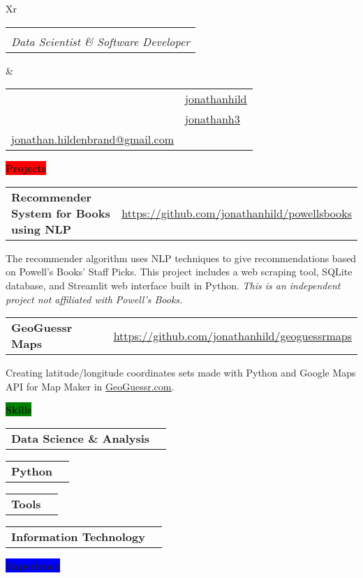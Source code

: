 \documentclass[letterpaper,12pt]{article}[leftmargin=*]
\makeatletter
\def\fullname{Jonathan Hildenbrand}
\def\subtitle{Data Scientist \& Software Developer}
\def\githubicon{\faGithub}
\def\githublink{https://github.com/jonathanhild}
\def\githubtext{jonathanhild}
\def\linkedinicon{\faLinkedin}
\def\linkedinlink{https://linkedin.com/in/jonathanh3}
\def\linkedintext{jonathanh3}
\def\phoneicon{\faPhone}
\def\phonetext{+1-971-409-0695}
\def\emailicon{\faEnvelope}
\def\emaillink{mailto:jonathan.hildenbrand+resume@gmail.com}
\def\emailtext{jonathan.hildenbrand@gmail.com}
\def\locationicon{\faMapMarker}
\def\locationtext{Portland, Oregon}
\def\targeticon{\faBinoculars}
\def\targettext{Local, Remote WFH \& Relocation}
\def\headertype{\doublecol} %
\def\entryspacing{-0pt}
\def\location{\hspace{3pt}\locationicon \hspace{5pt}{\color{links}\locationtext}}
\def\target{\targeticon\hspace{3pt}{\color{links}\targettext}}
\def\phone{\phoneicon\hspace{3pt}{\color{links}{\phonetext}}}
\def\linkedin{\linkedinicon\hspace{3pt}\href{\linkedinlink}{\underline{\linkedintext}}}
\def\email{\emailicon\hspace{3pt}\href{\emaillink}{\underline{\emailtext}}}
\def\github{\githubicon\hspace{3pt}\href{\githublink}{\underline{\githubtext}}}
\newcommand{\projects}[2]{\vspace{6pt}
  \colorbox{Red}{\color{white}\raggedbottom\normalsize\textbf{{#1}{\hspace{9pt}#2\hspace{4pt}}}}
}
\newcommand{\skills}[2]{\vspace{6pt}
  \colorbox{Green}{\color{white}\raggedbottom\normalsize\textbf{{#1}{\hspace{9pt}#2\hspace{4pt}}}}
}
\newcommand{\experience}[2]{\vspace{6pt}
  \colorbox{Blue}{\color{white}\raggedbottom\normalsize\textbf{{#1}{\hspace{9pt}#2\hspace{4pt}}}}
}
\newcommand{\resumeEntryStart}{\begin{itemize}[leftmargin=2.5mm]}
\newcommand{\resumeEntryEnd}{\end{itemize}\vspace{\entryspacing}}
\newcommand{\resumeItemListStart}{\begin{itemize}[leftmargin=4.5mm]}
\newcommand{\resumeItemListEnd}{\end{itemize}}
\newcommand{\resumeItem}[1]{
  \item\small{
    {#1 \vspace{-2pt}}
  }
}
\newcommand{\repo}[2]{\href{#1}{\underline{#2}}}
\newcommand{\resumeEntryTD}[2]{
  \vspace{-1pt}\item[]
    \begin{tabularx}{0.97\textwidth}{X@{\hspace{60pt}}r}
      \textbf{\color{primary}#1} & {\firabook\color{accent}\small#2} \\
    \end{tabularx}\vspace{-6pt}
}
\newcommand{\resumeEntryS}[2]{
  \item[]
    \vspace{-1pt}
      \begin{tabular}{ p{2in} m{5.5in} }
      {\small{\textbf{#1 }}} & {\small{#2}}
      \end{tabular}\vspace{-6pt}
}
\newcommand{\tag}[1]{%
  \tikzmarknode[fill=white,fill
opacity=0,draw=subtle!60!subtle,thick,rounded corners,inner sep=0.4ex,text height=1.5ex,text depth=.25ex, text opacity=1]{test}{\small{#1}}
}
\newcommand{\doublecol}[6]{
  \begin{tabularx}{\textwidth}{Xr}
    {
      \begin{tabular}[c]{l}
        \fontsize{24}{34}\selectfont{\color{primary}{{\textbf{\fullname}}}} \\
        {\textit{\subtitle}} %
      \end{tabular}
    } & {
      \begin{tabular}[c]{l@{\hspace{1.5em}}l}
        {\small#4} & {\small#1} \\
        {\small#5} & {\small#2} \\
        {\small#6} & {\small#3}
      \end{tabular}
    }
  \end{tabularx}
}
\newcommand{\singlecol}[6]{
  \begin{tabularx}{\textwidth}{Xr}
    {
      \begin{tabular}[b]{l}
        \fontsize{35}{45}\selectfont{\color{primary}{{\textbf{\fullname}}}} \\
        {\textit{\subtitle}} %
      \end{tabular}
    } & {
      \begin{tabular}[c]{l}
        {\small#1} \\
        {\small#2} \\
        {\small#3} \\
        {\small#4} \\
        {\small#5} \\
        {\small#6}
      \end{tabular}
    }
  \end{tabularx}
}
\makeatother
\begin{document}
\headertype{\github}{\linkedin}{\phone}{\location}{\target}{\email} %

\projects{\faFlask}{Projects}

\resumeEntryStart{
  \resumeEntryTD{Recommender System for Books using NLP}{\repo{https://github.com/jonathanhild/powellsbooks}{https://github.com/jonathanhild/powellsbooks}}
  \resumeItemListStart{
    \resumeItem{\tag{In Process} The recommender algorithm uses NLP techniques to give recommendations based on Powell's Books' Staff Picks. This project includes a web scraping tool, SQLite database, and Streamlit web interface built in Python. \textit{This is an independent project not affiliated with Powell’s Books.}}}
  \resumeItemListEnd{}
  \resumeEntryTD{GeoGuessr Maps}{\repo{https://github.com/jonathanhild/geoguessrmaps}{https://github.com/jonathanhild/geoguessrmaps}}
  \resumeItemListStart{
    \resumeItem{Creating latitude/longitude coordinates sets made with Python and Google Maps API for Map Maker in \href{https://www.geoguessr.com}{\underline{GeoGuessr.com}}.}}
  \resumeItemListEnd}
\resumeEntryEnd{}

\skills{\faGears}{Skills}

\resumeEntryStart{
  \resumeEntryS{Data Science \& Analysis}{\tag{Data Cleaning \& ETL}\tag{Machine Learning}\tag{Web Scraping}\tag{Database Design}\tag{Regex}\tag{Technical Writing \& Communication}\tag{Accounting}}
  \resumeEntryS{Python}{\tag{Pandas}\tag{Numpy}\tag{SKLearn}\tag{Matplotlib}\tag{Seaborn}\tag{SQLAlchemy}\tag{Beautiful Soup}}}
\resumeEntryS{Tools} {\tag{SQL}\tag{Anaconda}\tag{PostgreSQL}\tag{SQL Server}\tag{SQLite}\tag{SSMS}\tag{Git \& GitHub}\tag{Excel}}
\resumeEntryS{Information Technology} {\tag{Database Admin}\tag{Ubuntu Linux 16.04+}\tag{Windows Server Admin}\tag{Dynamics NAV}}
\resumeEntryEnd{}

\experience{\faPieChart}{Experience}
\end{document}
